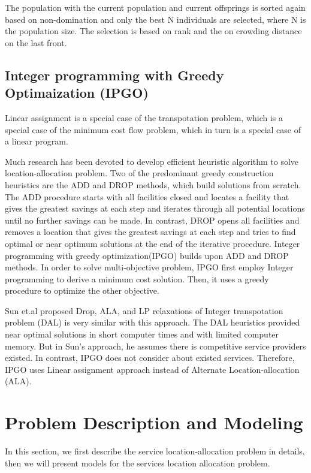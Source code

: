 \documentclass{llncs}
\begin{document}
The population with the current population and current offsprings is sorted again based on non-domination and only the best N individuals are selected, where N is the population size.
The selection is based on rank and the on crowding distance on the last front.

\subsection{Integer programming with Greedy Optimaization (IPGO)}

Linear assignment \cite{lawler1963quadratic} is a special case of the transpotation problem, which is a special case of the minimum cost flow problem, which
in turn is a special case of a linear program.

Much research has been devoted to develop efficient heuristic algorithm to solve location-allocation problem. Two of the predominant
greedy construction heuristics are the ADD and DROP \cite{Sun} methods, which build solutions from scratch. 
The ADD procedure starts with all facilities closed and locates a facility that gives the greatest savings at each step and 
iterates through all potential locations until no further savings can be made. In contrast, DROP opens all facilities and removes a 
location that gives the greatest savings at each step and tries to find optimal or near optimum solutions at the end of the 
iterative procedure. Integer programming with greedy optimization(IPGO) builds upon ADD and DROP methods. 
In order to solve multi-objective problem, IPGO first employ Integer programming to derive a minimum cost solution. Then, it
uses a greedy procedure to optimize the other objective.

Sun et.al proposed Drop, ALA, and LP relaxations of Integer transpotation problem (DAL) \cite{Sun} is very similar with this approach. 
The DAL heuristics provided near optimal solutions in short computer times and with limited computer memory. But in Sun's approach, 
he assumes there is competitive service providers existed. In contrast, IPGO does not consider about existed services. Therefore, IPGO
uses Linear assignment approach instead of Alternate Location-allocation (ALA).



\section{Problem Description and Modeling}
\label{sec:problem}
In this section, we first describe the service location-allocation problem in details, then we will present models for the services location allocation problem.
\end{document}
